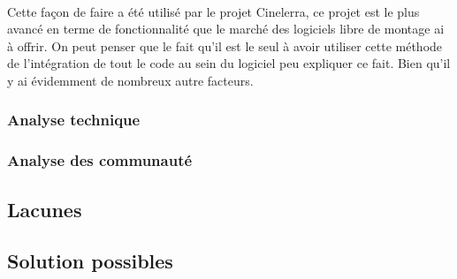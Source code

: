 \paragraph{} Cette façon de faire a été utilisé par le projet
Cinelerra, ce projet est le plus avancé en terme de fonctionnalité
que le marché des logiciels libre de montage ai à offrir. On peut
penser que le fait qu'il est le seul à avoir utiliser cette méthode
de l'intégration de tout le code au sein du logiciel peu expliquer ce
fait. Bien qu'il y ai évidemment de nombreux autre facteurs.


\subsubsection{Analyse technique}

\subsubsection{Analyse des communauté}

\subsection{Lacunes}

\subsection{Solution possibles}
